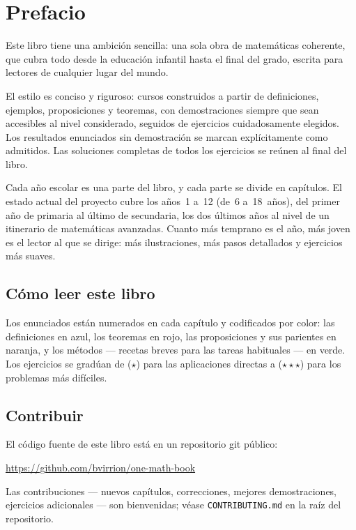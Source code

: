 \chapter{Prefacio}

Este libro tiene una ambición sencilla: una sola obra de matemáticas
coherente, que cubra todo desde la educación infantil hasta el final del
grado, escrita para lectores de cualquier lugar del mundo.

El estilo es conciso y riguroso: cursos construidos a partir de
definiciones, ejemplos, proposiciones y teoremas, con demostraciones
siempre que sean accesibles al nivel considerado, seguidos de ejercicios
cuidadosamente elegidos. Los resultados enunciados sin demostración se
marcan explícitamente como admitidos. Las soluciones completas de todos
los ejercicios se reúnen al final del libro.

Cada año escolar es una parte del libro, y cada parte se divide en
capítulos. El estado actual del proyecto cubre los años~1 a~12 (de~6
a~18~años), del primer año de primaria al último de secundaria, los dos
últimos años al nivel de un itinerario de matemáticas avanzadas. Cuanto
más temprano es el año, más joven es el lector al que se dirige: más
ilustraciones, más pasos detallados y ejercicios más suaves.

\section*{Cómo leer este libro}

Los enunciados están numerados en cada capítulo y codificados por
color: las definiciones en azul, los teoremas en rojo, las proposiciones
y sus parientes en naranja, y los métodos --- recetas breves para las
tareas habituales --- en verde. Los ejercicios se gradúan de ($\star$)
para las aplicaciones directas a ($\star\star\star$) para los problemas
más difíciles.

\section*{Contribuir}

El código fuente de este libro está en un repositorio git público:
\begin{center}
\url{https://github.com/bvirrion/one-math-book}
\end{center}
Las contribuciones --- nuevos capítulos, correcciones, mejores
demostraciones, ejercicios adicionales --- son bienvenidas; véase
\texttt{CONTRIBUTING.md} en la raíz del repositorio.
